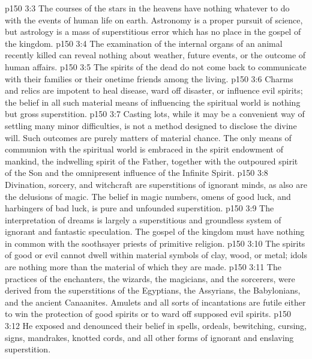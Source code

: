 \vs p150 3:3 \bibnobreakspace The courses of the stars in the heavens have nothing whatever to do with the events of human life on earth. Astronomy is a proper pursuit of science, but astrology is a mass of superstitious error which has no place in the gospel of the kingdom.
\vs p150 3:4 \bibnobreakspace The examination of the internal organs of an animal recently killed can reveal nothing about weather, future events, or the outcome of human affairs.
\vs p150 3:5 \bibnobreakspace The spirits of the dead do not come back to communicate with their families or their onetime friends among the living.
\vs p150 3:6 \bibnobreakspace Charms and relics are impotent to heal disease, ward off disaster, or influence evil spirits; the belief in all such material means of influencing the spiritual world is nothing but gross superstition.
\vs p150 3:7 \bibnobreakspace Casting lots, while it may be a convenient way of settling many minor difficulties, is not a method designed to disclose the divine will. Such outcomes are purely matters of material chance. The only means of communion with the spiritual world is embraced in the spirit endowment of mankind, the indwelling spirit of the Father, together with the outpoured spirit of the Son and the omnipresent influence of the Infinite Spirit.
\vs p150 3:8 \bibnobreakspace Divination, sorcery, and witchcraft are superstitions of ignorant minds, as also are the delusions of magic. The belief in magic numbers, omens of good luck, and harbingers of bad luck, is pure and unfounded superstition.
\vs p150 3:9 \bibnobreakspace The interpretation of dreams is largely a superstitious and groundless system of ignorant and fantastic speculation. The gospel of the kingdom must have nothing in common with the soothsayer priests of primitive religion.
\vs p150 3:10 \bibnobreakspace The spirits of good or evil cannot dwell within material symbols of clay, wood, or metal; idols are nothing more than the material of which they are made.
\vs p150 3:11 \bibnobreakspace The practices of the enchanters, the wizards, the magicians, and the sorcerers, were derived from the superstitions of the Egyptians, the Assyrians, the Babylonians, and the ancient Canaanites. Amulets and all sorts of incantations are futile either to win the protection of good spirits or to ward off supposed evil spirits.
\vs p150 3:12 \bibnobreakspace He exposed and denounced their belief in spells, ordeals, bewitching, cursing, signs, mandrakes, knotted cords, and all other forms of ignorant and enslaving superstition.
